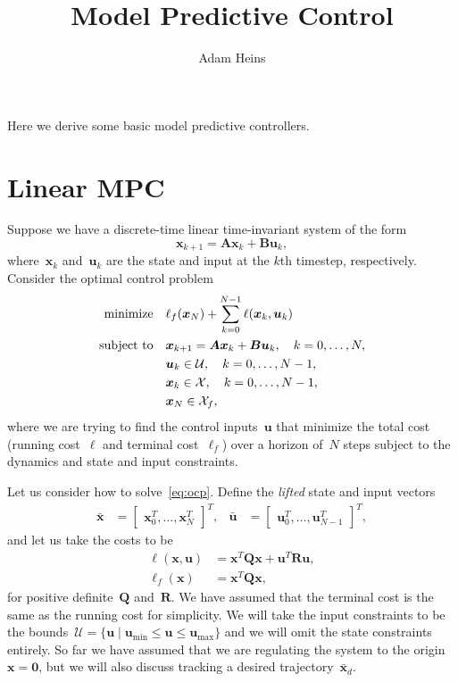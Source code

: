 \documentclass{article}
\title{Model Predictive Control}
\author{Adam Heins}
\begin{document}
\maketitle

Here we derive some basic model predictive controllers.

\section{Linear MPC}

Suppose we have a discrete-time linear time-invariant system of the form
\begin{equation*}
  \bm{x}_{k+1} = \bm{A}\bm{x}_k + \bm{B}\bm{u}_k,
\end{equation*}
where~$\bm{x}_k$ and~$\bm{u}_k$ are the state and input at the $k$th timestep,
respectively. Consider the optimal control problem
\begin{equation}\label{eq:ocp}
  \begin{aligned}
    \operatorname*{minimize} &\quad \ell_f(\bm{x}_N) + \sum_{k=0}^{N-1} \ell(\bm{x}_k,\bm{u}_k) \\
    \text{subject to} &\quad \bm{x}_{k+1} = \bm{A}\bm{x}_k + \bm{B}\bm{u}_k, \quad k=0,\dots,N, \\
                      &\quad \bm{u}_k\in\mathcal{U}, \quad k=0,\dots,N-1, \\
                      &\quad \bm{x}_k\in\mathcal{X}, \quad k=0,\dots,N-1, \\
                      &\quad \bm{x}_N\in\mathcal{X}_f,
  \end{aligned}
\end{equation}
where we are trying to find the control inputs~$\bm{u}$ that minimize the total
cost (running cost~$\ell$ and terminal cost~$\ell_f$) over a horizon of~$N$
steps subject to the dynamics and state and input constraints.

Let us consider how to solve~\eqref{eq:ocp}. Define the \emph{lifted} state and
input vectors
\begin{align*}
  \bar{\bm{x}} &= \begin{bmatrix} \bm{x}_0^T,\dots,\bm{x}_N^T \end{bmatrix}^T, &
  \bar{\bm{u}} &= \begin{bmatrix} \bm{u}_0^T,\dots,\bm{u}_{N-1}^T \end{bmatrix}^T,
\end{align*}
and let us take the costs to be
\begin{align*}
  \ell(\bm{x},\bm{u}) &= \bm{x}^T\bm{Q}\bm{x} + \bm{u}^T\bm{R}\bm{u}, \\
  \ell_f(\bm{x}) &= \bm{x}^T\bm{Q}\bm{x},
\end{align*}
for positive definite~$\bm{Q}$ and~$\bm{R}$. We have assumed that the terminal
cost is the same as the running cost for simplicity. We will take the input
constraints to be the bounds~$\mathcal{U}=\{\bm{u}\mid
\bm{u}_{\min}\leq\bm{u}\leq\bm{u}_{\max}\}$ and we will omit the state
constraints entirely. So far we have assumed that we are regulating the system
to the origin~$\bm{x}=\bm{0}$, but we will also discuss tracking a desired
trajectory~$\bar{\bm{x}}_d$.
\end{document}

